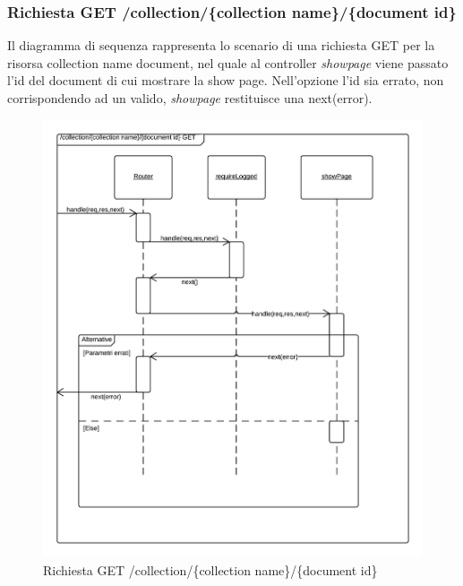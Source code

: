 \subsubsection{Richiesta GET /collection/\{collection name\}/\{document id\}} 
Il diagramma di sequenza rappresenta lo scenario di una richiesta GET per la risorsa collection name document, nel quale al controller \emph{showpage} viene passato l'id del document di cui mostrare la show page.
Nell'opzione l'id sia errato, non corrispondendo ad un  valido, \emph{showpage} restituisce una next(error).
\begin{figure}[H]
	\begin{center} 
		\includegraphics[scale=0.20]{scenari/Collection Name Document GET.png}
		\caption{Richiesta GET /collection/\{collection name\}/\{document id\}}
	\end{center} 
\end{figure}

\pagebreak

